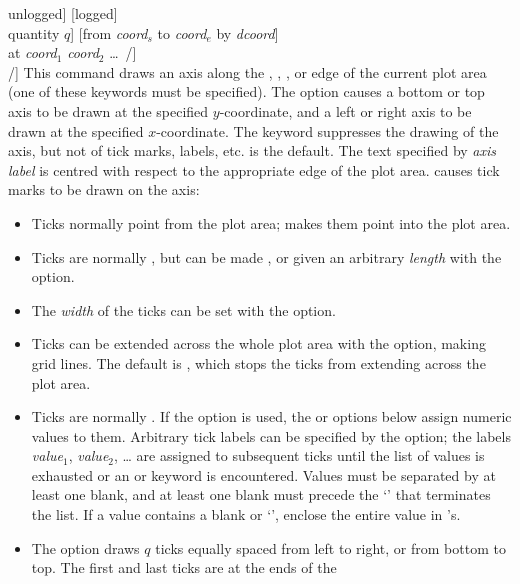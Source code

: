 \begin{syntax}
{{\quad\quad{\rm[}unlogged{\rm]} {\rm[}logged{\rm]}\\
\quad\quad{\rm[}quantity $q${\rm]} {\rm[}from \emph{coord}$_s$ to \emph{coord}$_e$ by
\emph{dcoord}{\rm]}\\
\quad\quad\quad{\rm[}at \emph{coord}$_1$ \emph{coord}$_2$ \ldots\ /{\rm]}\\
\quad/}}]
This command draws an axis along the , , ,
or  edge of the current plot area (one of these keywords must be
specified).
The  option causes a bottom or top axis to be
drawn at the specified $y$-coordinate, and a left or right axis to be drawn at
the specified $x$-coordinate.
The keyword  suppresses the drawing of the axis, but not of
tick marks, labels, etc.  is the default.
The text specified by \emph{axis label} is centred with respect to the
appropriate edge of the plot area.
 causes tick marks to be drawn on the axis:
\begin{itemize}
\item
Ticks normally point  from the plot area;  makes them point
into the plot area.
\item
Ticks are normally , but can be made , or given an
arbitrary \emph{length} with the  option.
\item
The \emph{width} of the ticks can be set with the  option.
\item
Ticks can be extended across the whole plot area with the 
option, making grid lines. The default is , which stops the
ticks from extending across the plot area.
\item
Ticks are normally . If the  option is used,
the  or  options below assign numeric values to them.
Arbitrary tick labels can be specified by the  option; the
labels \emph{value}$_1$, \emph{value}$_2$, \ldots{} are assigned to subsequent ticks until
the list of values is exhausted or an  or 
keyword is encountered. Values must be separated by at least one blank, and at
least one blank must precede the `\type{/}' that terminates the list. If a
value contains a blank or `\type{/}', enclose the entire value in
\type{\{\}}'s.
\item
The option  draws $q$ ticks equally spaced from left to
right, or from bottom to top. The first and last ticks are at the ends of the

\end{itemize}
\end{syntax}

